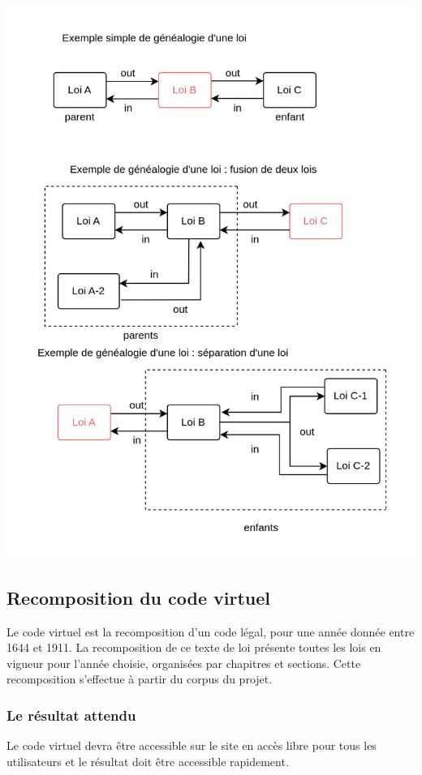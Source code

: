 \newpage
\noindent \includegraphics[width=\textwidth]{images/annexe8.png}

\newpage
\subsection*{Recomposition du code virtuel}
Le code virtuel est la recomposition d’un code légal, pour une année donnée entre 1644 et 1911. La recomposition de ce texte de loi présente toutes les lois en vigueur pour l’année choisie, organisées par chapitres et sections. Cette recomposition s’effectue à partir du corpus du projet. 

\subsubsection{Le résultat attendu}
Le code virtuel devra être accessible sur le site en accès libre pour tous les utilisateurs et le résultat doit être accessible rapidement. 

